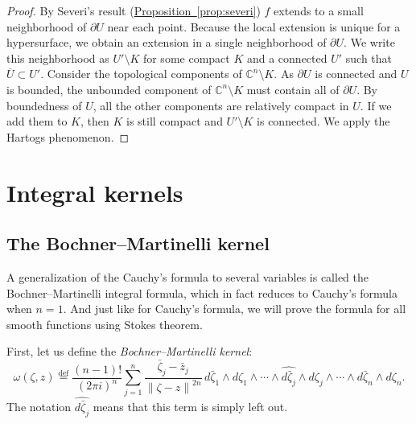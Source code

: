 \documentclass[12pt,openany]{book}
\newcommand{\norm}[1]{\left\lVert {#1} \right\rVert}
\newcommand{\C}{{\mathbb{C}}}
\newcommand{\myindex}[1]{#1\index{#1}}
\theoremstyle{plain}
\theoremstyle{remark}
\theoremstyle{definition}
\theoremstyle{exercise}
\theoremstyle{example}
\newcommand{\propref}[1]{\hyperref[#1]{Proposition~\ref*{#1}}}
\begin{document}
\begin{proof}
By Severi's result (\propref{prop:severi}) $f$ extends to a small neighborhood of $\partial U$
near each point.  Because the local extension is unique for a hypersurface,
we obtain an extension in a single neighborhood of $\partial U$.
We write this neighborhood as $U' \setminus K$ for some compact $K$
and a connected $U'$ such that $\overline{U} \subset U'$.
Consider the topological components of $\C^n \setminus K$.  As
$\partial U$ is connected and $U$ is bounded,
the unbounded component of $\C^n \setminus K$ must contain all of $\partial U$.
By boundedness of $U$, all the other components are
relatively compact in $U$.  If we add them to $K$, then $K$
is still compact and $U' \setminus K$ is connected.
We apply the Hartogs phenomenon.
\end{proof}


\chapter{Integral kernels} \label{ch:integralkernels}


\section{The Bochner--Martinelli kernel}

A generalization of
the Cauchy's formula to several variables
is called the Bochner--Martinelli integral formula,
which in fact reduces 
to Cauchy's formula when $n=1$.
And just like for Cauchy's formula, we will prove the formula for all
smooth functions using Stokes theorem.

First, let us define the \emph{\myindex{Bochner--Martinelli kernel}}:
\begin{equation*}
\omega(\zeta,z)
\overset{\text{def}}{=}
\frac{(n-1)!}{{(2\pi i)}^n}
\sum_{j=1}^n
\frac{\bar{\zeta}_j-\bar{z}_j}{\norm{\zeta-z}^{2n}}
\,
d\bar{\zeta}_1 \wedge d\zeta_1 \wedge
\cdots \wedge
\widehat{ d\bar{\zeta}_j } \wedge d\zeta_j \wedge
\cdots \wedge
d\bar{\zeta}_n \wedge d\zeta_n .
\end{equation*}
%
The notation $\widehat{ d\bar{\zeta}_j }$ means that this term is
simply left out.
\end{document}
